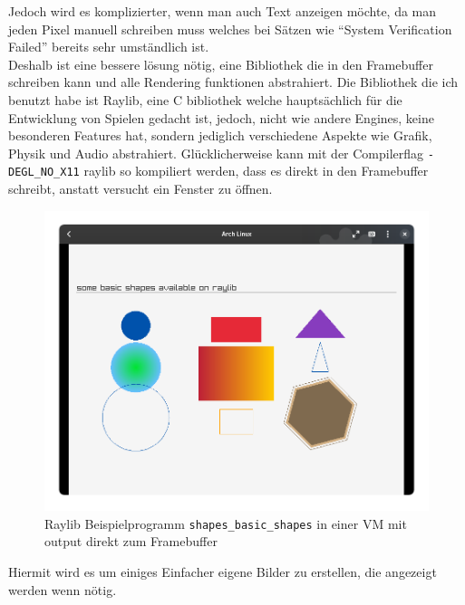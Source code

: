 Jedoch wird es komplizierter, wenn man auch Text anzeigen möchte, da man jeden Pixel manuell schreiben muss welches bei Sätzen wie ``System Verification Failed'' bereits sehr umständlich ist.\\
Deshalb ist eine bessere lösung nötig, eine Bibliothek die in den Framebuffer schreiben kann und alle Rendering funktionen abstrahiert. Die Bibliothek die ich benutzt habe ist Raylib, eine C bibliothek welche hauptsächlich für die Entwicklung von Spielen gedacht ist, jedoch, nicht wie andere Engines, keine besonderen Features hat, sondern jediglich verschiedene Aspekte wie Grafik, Physik und Audio abstrahiert. Glücklicherweise kann mit der Compilerflag \texttt{-DEGL\_NO\_X11} raylib so kompiliert werden, dass es direkt in den Framebuffer schreibt, anstatt versucht ein Fenster zu öffnen.
\bigbreak \noindent
\begin{figure}[h]
  \centering
  \includegraphics[scale=0.5]{realisierung/images/raylib-framebuffer.png}
  \caption{Raylib Beispielprogramm \texttt{shapes\_basic\_shapes} in einer VM mit output direkt zum Framebuffer}
\end{figure}

Hiermit wird es um einiges Einfacher eigene Bilder zu erstellen, die angezeigt werden wenn nötig.

